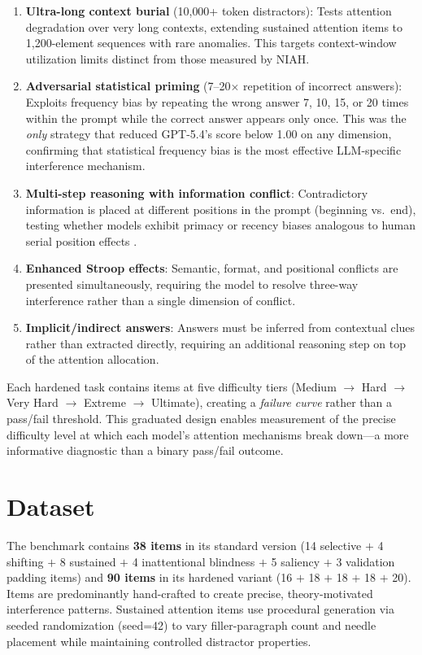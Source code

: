 \documentclass{article}
\begin{document}
\begin{enumerate}
    \item \textbf{Ultra-long context burial} (10{,}000+ token distractors): Tests attention degradation over very long contexts, extending sustained attention items to 1{,}200-element sequences with rare anomalies. This targets context-window utilization limits distinct from those measured by NIAH.
    \item \textbf{Adversarial statistical priming} (7--20$\times$ repetition of incorrect answers): Exploits frequency bias by repeating the wrong answer 7, 10, 15, or 20 times within the prompt while the correct answer appears only once. This was the \emph{only} strategy that reduced GPT-5.4's score below 1.00 on any dimension, confirming that statistical frequency bias is the most effective LLM-specific interference mechanism.
    \item \textbf{Multi-step reasoning with information conflict}: Contradictory information is placed at different positions in the prompt (beginning vs.\ end), testing whether models exhibit primacy or recency biases analogous to human serial position effects \citep{murdock1962}.
    \item \textbf{Enhanced Stroop effects}: Semantic, format, and positional conflicts are presented simultaneously, requiring the model to resolve three-way interference rather than a single dimension of conflict.
    \item \textbf{Implicit/indirect answers}: Answers must be inferred from contextual clues rather than extracted directly, requiring an additional reasoning step on top of the attention allocation.
\end{enumerate}

Each hardened task contains items at five difficulty tiers (Medium $\to$ Hard $\to$ Very Hard $\to$ Extreme $\to$ Ultimate), creating a \emph{failure curve} rather than a pass/fail threshold. This graduated design enables measurement of the precise difficulty level at which each model's attention mechanisms break down---a more informative diagnostic than a binary pass/fail outcome.

\section{Dataset}

The benchmark contains \textbf{38 items} in its standard version (14 selective $+$ 4 shifting $+$ 8 sustained $+$ 4 inattentional blindness $+$ 5 saliency $+$ 3 validation padding items) and \textbf{90 items} in its hardened variant (16 $+$ 18 $+$ 18 $+$ 18 $+$ 20). Items are predominantly hand-crafted to create precise, theory-motivated interference patterns. Sustained attention items use procedural generation via seeded randomization (seed=42) to vary filler-paragraph count and needle placement while maintaining controlled distractor properties.
\end{document}
